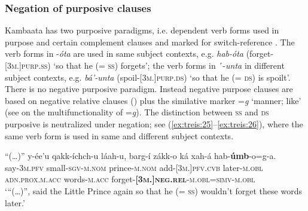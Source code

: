 \documentclass[output=paper,colorlinks,citecolor=brown,draftmode
]{langscibook}
\begin{document}
\subsubsection{Negation of purposive clauses}\label{sec:treis:2.4.3}

Kambaata has two purposive paradigms, i.e. dependent verb forms used in purpose and certain complement clauses and marked for switch-reference \citep{Treis2010}. The verb forms in -\textit{óta} are used in same subject contexts, e.g. \textit{hab-óta} (forget-\textsc{[3m.]\hspace{0pt}purp.\hspace{0pt}ss}) ‘so that he (= \textsc{ss}) forgets’; the verb forms in ´-\textit{unta} in different subject contexts, e.g. \textit{bá’-unta} (spoil-\textsc{[3m.]purp.ds}) ‘so that he (= \textsc{ds}) is spoilt’. There is no negative purposive paradigm. Instead negative purpose clauses are based on negative relative clauses () plus the similative marker =\textit{g} ‘manner; like’ (see \citealt{Treis2017} on the multifunctionality of =\textit{g}). The distinction between \textsc{ss} and \textsc{ds} purposive is neutralized under negation; see (\ref{ex:treis:25}--\ref{ex:treis:26}), where the same verb form is used in same and different subject contexts.

\ea\label{ex:treis:25} 
\gll “(…)” 	y-ée’u 		 qakk-íchch-u			láah-u,			barg-í zákk-o			ká							xah-á hab-\textbf{úmb}-o=g-a. \\
{} say-\textsc{3m.pfv}	 small-\textsc{sgv-m.nom}	prince-\textsc{m.nom}	add-\textsc{[3m.]pfv.cvb} later-\textsc{m.obl}	\textsc{\textsc{adn}.prox.m.acc}		words-\textsc{m.acc} forget-\textsc{\textbf{[3m.]neg.rel}-m.obl=simv-m.obl}\\
\glt ‘“(…)”, said the Little Prince again so that he (= \textsc{ss}) wouldn’t forget these words later.’  \citep[74]{Saint-Exupéry2018}
\z

\end{document}
